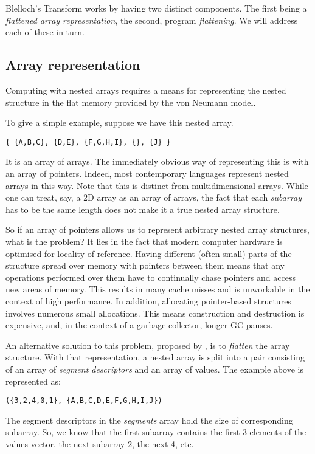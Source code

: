 Blelloch's Transform works by having two distinct components. The first being a \emph{flattened array representation}, the second, program \emph{flattening}. We will address each of these in turn.

\subsection{Array representation}
\label{sec:background-representation}

Computing with nested arrays requires a means for representing the nested structure in the flat memory provided by the von Neumann model.

To give a simple example, suppose we have this nested array.
%
\begin{lstlisting}
{ {A,B,C}, {D,E}, {F,G,H,I}, {}, {J} }
\end{lstlisting}
%
It is an array of arrays. The immediately obvious way of representing this is with an array of pointers. Indeed, most contemporary languages represent nested arrays in this way. Note that this is distinct from multidimensional arrays. While one can treat, say, a 2D array as an array of arrays, the fact that each \emph{subarray} has to be the same length does not make it a true nested array structure.

So if an array of pointers allows us to represent arbitrary nested array structures, what is the problem? It lies in the fact that modern computer hardware is optimised for locality of reference. Having different (often small) parts of the structure spread over memory with pointers between them means that any operations performed over them have to continually chase pointers and access new areas of memory. This results in many cache misses and is unworkable in the context of high performance. In addition, allocating pointer-based structures involves numerous small allocations. This means construction and destruction is expensive, and, in the context of a garbage collector, longer GC pauses.

An alternative solution to this problem, proposed by \citet{Blelloch:compiling1988}, is to \emph{flatten} the array structure. With that representation, a nested array is split into a pair consisting of an array of \emph{segment descriptors} and an array of values. The example above is represented as:
%
\begin{lstlisting}
({3,2,4,0,1}, {A,B,C,D,E,F,G,H,I,J})
\end{lstlisting}
%
The segment descriptors in the \emph{segments} array hold the size of corresponding subarray. So, we know that the first subarray contains the first 3 elements of the values vector, the next subarray 2, the next 4, etc.

